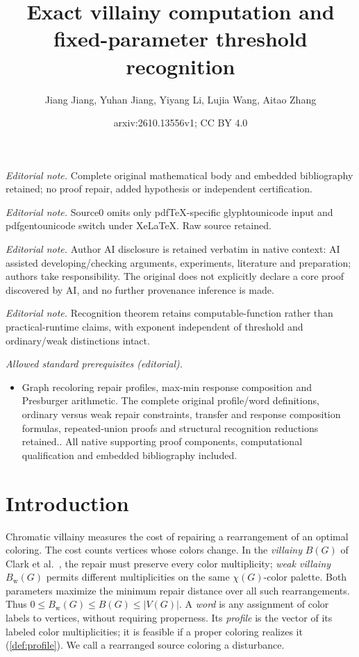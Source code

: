 \documentclass[10pt,a4paper]{amsart}
\title{Exact villainy computation and fixed-parameter threshold recognition}
\author{Jiang Jiang, Yuhan Jiang, Yiyang Li, Lujia Wang, Aitao Zhang}
\date{arxiv:2610.13556v1; CC BY 4.0}
\numberwithin{equation}{section}
\theoremstyle{definition}
\theoremstyle{remark}
\begin{document}
\maketitle
\noindent\textit{Editorial note.} Complete original mathematical body and embedded bibliography retained; no proof repair, added hypothesis or independent certification.\par\medskip
\noindent\textit{Editorial note.} Source0 omits only pdfTeX-specific glyphtounicode input and pdfgentounicode switch under XeLaTeX. Raw source retained.\par\medskip
\noindent\textit{Editorial note.} Author AI disclosure is retained verbatim in native context: AI assisted developing/checking arguments, experiments, literature and preparation; authors take responsibility. The original does not explicitly declare a core proof discovered by AI, and no further provenance inference is made.\par\medskip
\noindent\textit{Editorial note.} Recognition theorem retains computable-function rather than practical-runtime claims, with exponent independent of threshold and ordinary/weak distinctions intact.\par\medskip
\noindent\textit{Allowed standard prerequisites (editorial).}\begin{itemize}
\item Graph recoloring repair profiles, max-min response composition and Presburger arithmetic. The complete original profile/word definitions, ordinary versus weak repair constraints, transfer and response composition formulas, repeated-union proofs and structural recognition reductions retained.. All native supporting proof components, computational qualification and embedded bibliography included.
\end{itemize}\medskip
\section{Introduction}

Chromatic villainy measures the cost of repairing a rearrangement of
an optimal coloring. The cost counts vertices whose colors change.
In the \emph{villainy} $B(G)$ of Clark et al.~\cite{clark2006},
the repair must preserve every color multiplicity; \emph{weak
villainy} $B_{\mathrm w}(G)$ permits different multiplicities on the
same $\chi(G)$-color palette. Both parameters maximize the minimum
repair distance over all such rearrangements. Thus
$0\le B_{\mathrm w}(G)\le B(G)\le |V(G)|$.
A \emph{word} is any assignment of color labels to vertices, without
requiring properness. Its \emph{profile} is the vector of its labeled color
multiplicities; it is feasible if a proper coloring realizes it
(\cref{def:profile}). We call a rearranged source coloring a disturbance.
\end{document}
